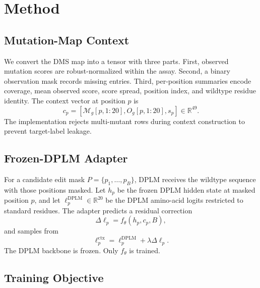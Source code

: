 \documentclass{article}
\newcommand{\M}{\mathcal{M}}
\newcommand{\1}{\mathbf{1}}
\begin{document}
\section{Method}

\subsection{Mutation-Map Context}

We convert the DMS map into a tensor with three parts. First, observed mutation scores are robust-normalized within the assay. Second, a binary observation mask records missing entries. Third, per-position summaries encode coverage, mean observed score, score spread, position index, and wildtype residue identity. The context vector at position $p$ is
\begin{equation}
  c_p =
  [\M_g[p,1:20], O_g[p,1:20], s_p] \in \mathbb{R}^{49}.
\end{equation}
The implementation rejects multi-mutant rows during context construction to prevent target-label leakage.

\subsection{Frozen-DPLM Adapter}

For a candidate edit mask $P=\{p_1,\ldots,p_B\}$, DPLM receives the wildtype sequence with those positions masked. Let $h_p$ be the frozen DPLM hidden state at masked position $p$, and let $\ell^{\mathrm{DPLM}}_p \in \mathbb{R}^{20}$ be the DPLM amino-acid logits restricted to standard residues. The adapter predicts a residual correction
\begin{equation}
  \Delta \ell_p =
  f_\theta(h_p, c_p, B),
\end{equation}
and samples from
\begin{equation}
  \ell^{\mathrm{ctx}}_p =
  \ell^{\mathrm{DPLM}}_p + \lambda \Delta \ell_p.
\end{equation}
The DPLM backbone is frozen. Only $f_\theta$ is trained.

\subsection{Training Objective}
\end{document}
